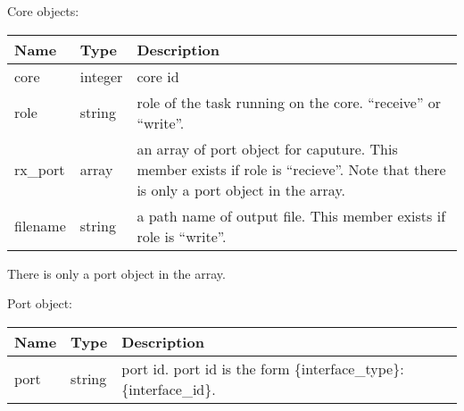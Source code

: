 \documentclass[a4paper,11pt,openany,oneside,english]{sphinxmanual}
\begin{document}
Core objects:


\begin{savenotes}\sphinxattablestart
\centering
{}
\sphinxthecaptionisattop
{}\label{\detokenize{api_ref/spp_pcap:id11}}\label{\detokenize{api_ref/spp_pcap:table-spp-ctl-spp-pcap-res-core}}
\sphinxaftertopcaption
\begin{tabulary}{\linewidth}[t]{|T|T|T|}
\hline
\sphinxstyletheadfamily 
Name
&\sphinxstyletheadfamily 
Type
&\sphinxstyletheadfamily 
Description
\\
\hline
core
&
integer
&
core id
\\
\hline
role
&
string
&
role of the task running on the core. “receive” or “write”.
\\
\hline
rx\_port
&
array
&
an array of port object for caputure. This member exists if role is
“recieve”. Note that there is only a port object in the array.
\\
\hline
filename
&
string
&
a path name of output file. This member exists if role is “write”.
\\
\hline
\end{tabulary}
\par
\sphinxattableend\end{savenotes}

There is only a port object in the array.

Port object:


\begin{savenotes}\sphinxattablestart
\centering
{}
\sphinxthecaptionisattop
{}\label{\detokenize{api_ref/spp_pcap:id12}}\label{\detokenize{api_ref/spp_pcap:table-spp-ctl-spp-pcap-res-port}}
\sphinxaftertopcaption
\begin{tabulary}{\linewidth}[t]{|T|T|T|}
\hline
\sphinxstyletheadfamily 
Name
&\sphinxstyletheadfamily 
Type
&\sphinxstyletheadfamily 
Description
\\
\hline
port
&
string
&
port id. port id is the form \{interface\_type\}:\{interface\_id\}.
\\
\hline
\end{tabulary}
\par
\sphinxattableend\end{savenotes}
\end{document}
